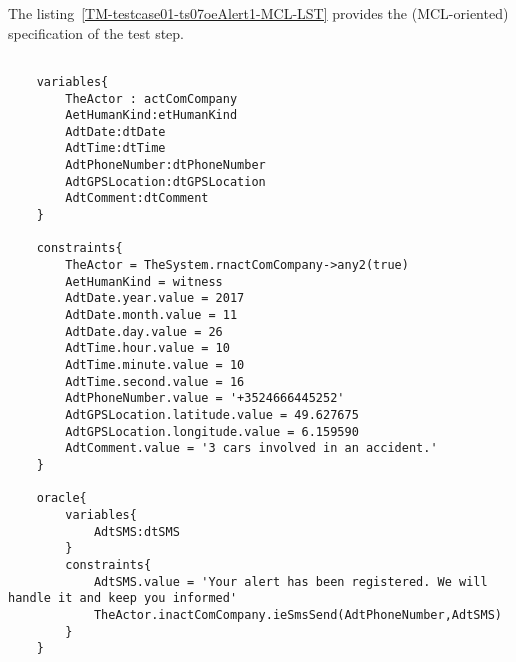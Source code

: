 	
	
		
	\vspace{1cm}
	The listing~\ref{TM-testcase01-ts07oeAlert1-MCL-LST} provides the \msrmessir (MCL-oriented) specification of the test step.
	
	\scriptsize
	\vspace{0.5cm}
	\begin{lstlisting}[style=MessirStyle,firstnumber=auto,captionpos=b,caption={\msrmessir (MCL-oriented) specification of the test step \emph{testcase01-ts07oeAlert1}.},label=TM-testcase01-ts07oeAlert1-MCL-LST]

	variables{
		TheActor : actComCompany
		AetHumanKind:etHumanKind
		AdtDate:dtDate
		AdtTime:dtTime
		AdtPhoneNumber:dtPhoneNumber
		AdtGPSLocation:dtGPSLocation
		AdtComment:dtComment
	}
	
	constraints{
		TheActor = TheSystem.rnactComCompany->any2(true)
		AetHumanKind = witness
		AdtDate.year.value = 2017
		AdtDate.month.value = 11
		AdtDate.day.value = 26
		AdtTime.hour.value = 10
		AdtTime.minute.value = 10
		AdtTime.second.value = 16
		AdtPhoneNumber.value = '+3524666445252'
		AdtGPSLocation.latitude.value = 49.627675
		AdtGPSLocation.longitude.value = 6.159590
		AdtComment.value = '3 cars involved in an accident.'
	}
	
	oracle{
		variables{
			AdtSMS:dtSMS
		}
		constraints{
			AdtSMS.value = 'Your alert has been registered. We will handle it and keep you informed'
			TheActor.inactComCompany.ieSmsSend(AdtPhoneNumber,AdtSMS)
		}
	}
	
	\end{lstlisting}
	\normalsize 
	
	
